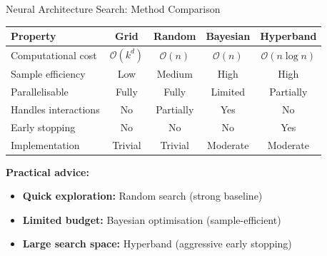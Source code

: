 \documentclass[aspectratio=169,11pt]{beamer}
\newcommand{\emphc}[1]{\textcolor{harvardcrimson}{#1}}
\begin{document}
\begin{frame}{Neural Architecture Search: Method Comparison}
\begin{center}
\renewcommand{\arraystretch}{1.3}
{\small
\begin{tabular}{@{}lcccc@{}}
\toprule
\textbf{Property} & \textbf{Grid} & \textbf{Random} & \textbf{Bayesian} & \textbf{Hyperband} \\
\midrule
Computational cost & $\mathcal{O}(k^d)$ & $\mathcal{O}(n)$ & $\mathcal{O}(n)$ & $\mathcal{O}(n \log n)$ \\
Sample efficiency & Low & Medium & \emphc{High} & High \\
Parallelisable & Fully & Fully & Limited & Partially \\
Handles interactions & No & Partially & \emphc{Yes} & No \\
Early stopping & No & No & No & \emphc{Yes} \\
Implementation & Trivial & Trivial & Moderate & Moderate \\
\bottomrule
\end{tabular}
}
\end{center}

\vspace{0.4cm}
\textbf{Practical advice:}
\begin{itemize}
    \item \textbf{Quick exploration:} Random search (strong baseline)
    \item \textbf{Limited budget:} Bayesian optimisation (sample-efficient)
    \item \textbf{Large search space:} Hyperband (aggressive early stopping)
\end{itemize}
\end{frame}
\end{document}
